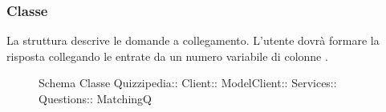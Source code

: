 \subsubsection{Classe }
La struttura descrive le domande a collegamento. L'utente dovrà formare la risposta collegando le entrate da un numero variabile di colonne .
\begin{figure}[H]
\centering
\noindent{}
\caption[Schema Classe MatchingQ]{Schema Classe Quizzipedia:: Client:: ModelClient:: Services:: Questions:: MatchingQ}
\end{figure}
